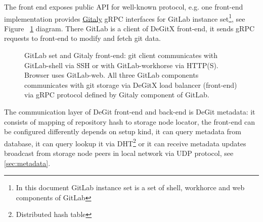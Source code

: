 \documentclass[12pt,oneside]{article}
\begin{document}
The front end exposes public API for well-known protocol, e.g. one front-end implementation provides
\href{https://docs.gitlab.com/ee/administration/gitaly/}{Gitaly} gRPC interfaces for GitLab
instance set\footnote{In this document GitLab instance set is a set of shell, workhorce and web components of GitLab},
see Figure ~\ref{fig:gitlab-set} diagram. There GitLab is a client of DeGitX front-end, it sends gRPC requests to
front-end to modify and fetch git data.

\begin{figure}
  \begin{center}
  \end{center}
  \caption{
    GitLab set and Gitaly front-end:
    git client communicates with GitLab-shell via SSH or with GitLab-workhorse via HTTP(S).
    Browser uses GitLab-web. All three GitLab components communicates with git storage via DeGitX load balancer
    (front-end) via gRPC protocol defined by Gitaly component of GitLab.
  }
  \label{fig:gitlab-set}
\end{figure}

The communication layer of DeGit front-end and back-end is DeGit metadata: it consists of mapping
of repository hash to storage node locator, the front-end can be configured differently depends on
setup kind, it can query metadata from database, it can query lookup it via DHT\footnote{Distributed hash table}
or it can receive metadata updates broadcast from storage node peers in local network via UDP protocol,
see \ref{sec:metadata}.
\end{document}
